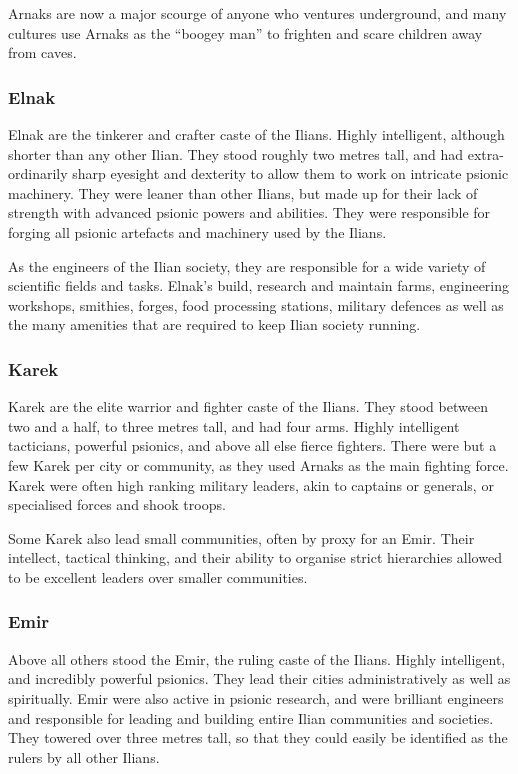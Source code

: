 Arnaks are now a major scourge of anyone who ventures underground, and many
cultures use Arnaks as the ``boogey man'' to frighten and scare children away
from caves.

\subsubsection{Elnak}
\label{sec:Elnak}

Elnak are the tinkerer and crafter caste of the Ilians. Highly intelligent,
although shorter than any other Ilian. They stood roughly two metres tall, and
had extra-ordinarily sharp eyesight and dexterity to allow them to work on
intricate psionic machinery. They were leaner than other Ilians, but made up
for their lack of strength with advanced psionic powers and abilities. They
were responsible for forging all psionic artefacts and machinery used by the
Ilians.

As the engineers of the Ilian society, they are responsible for a wide variety
of scientific fields and tasks. Elnak's build, research and maintain farms,
engineering workshops, smithies, forges, food processing stations, military
defences as well as the many amenities that are required to keep Ilian society
running.

\subsubsection{Karek}
\label{sec:Karek}

Karek are the elite warrior and fighter caste of the Ilians. They stood between
two and a half, to three metres tall, and had four arms. Highly intelligent
tacticians, powerful psionics, and above all else fierce fighters. There were
but a few Karek per city or community, as they used Arnaks as the main fighting
force. Karek were often high ranking military leaders, akin to captains or
generals, or specialised forces and shook troops.

Some Karek also lead small communities, often by proxy for an Emir. Their
intellect, tactical thinking, and their ability to organise strict hierarchies
allowed to be excellent leaders over smaller communities.

\subsubsection{Emir}
\label{sec:Emir}

Above all others stood the Emir, the ruling caste of the Ilians. Highly
intelligent, and incredibly powerful psionics. They lead their cities
administratively as well as spiritually. Emir were also active in psionic
research, and were brilliant engineers and responsible for leading and
building entire Ilian communities and societies. They towered over three
metres tall, so that they could easily be identified as the rulers by all
other Ilians.

